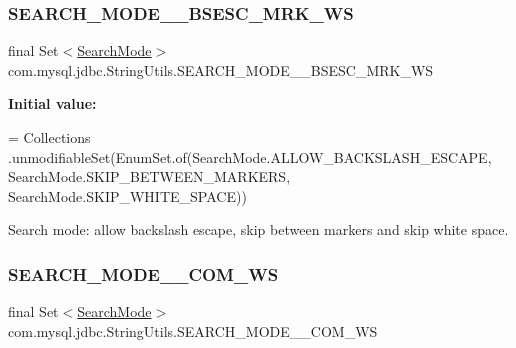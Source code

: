 \subsubsection{\texorpdfstring{S\+E\+A\+R\+C\+H\+\_\+\+M\+O\+D\+E\+\_\+\+\_\+\+B\+S\+E\+S\+C\+\_\+\+M\+R\+K\+\_\+\+WS}{SEARCH\_MODE\_\_BSESC\_MRK\_WS}}
{\footnotesize\ttfamily final Set$<$\mbox{\hyperlink{enumcom_1_1mysql_1_1jdbc_1_1_string_utils_1_1_search_mode}{Search\+Mode}}$>$ com.\+mysql.\+jdbc.\+String\+Utils.\+S\+E\+A\+R\+C\+H\+\_\+\+M\+O\+D\+E\+\_\+\+\_\+\+B\+S\+E\+S\+C\+\_\+\+M\+R\+K\+\_\+\+WS\hspace{0.3cm}{\ttfamily [static]}}

{\bfseries Initial value\+:}
\begin{DoxyCode}
= Collections
            .unmodifiableSet(EnumSet.of(SearchMode.ALLOW\_BACKSLASH\_ESCAPE, SearchMode.SKIP\_BETWEEN\_MARKERS,
       SearchMode.SKIP\_WHITE\_SPACE))
\end{DoxyCode}
Search mode\+: allow backslash escape, skip between markers and skip white space. \mbox{\label{classcom_1_1mysql_1_1jdbc_1_1_string_utils_ad7e062e4d813140127bb184c5e040cc6}} 
\subsubsection{\texorpdfstring{S\+E\+A\+R\+C\+H\+\_\+\+M\+O\+D\+E\+\_\+\+\_\+\+C\+O\+M\+\_\+\+WS}{SEARCH\_MODE\_\_COM\_WS}}
{\footnotesize\ttfamily final Set$<$\mbox{\hyperlink{enumcom_1_1mysql_1_1jdbc_1_1_string_utils_1_1_search_mode}{Search\+Mode}}$>$ com.\+mysql.\+jdbc.\+String\+Utils.\+S\+E\+A\+R\+C\+H\+\_\+\+M\+O\+D\+E\+\_\+\+\_\+\+C\+O\+M\+\_\+\+WS\hspace{0.3cm}{\ttfamily [static]}}

